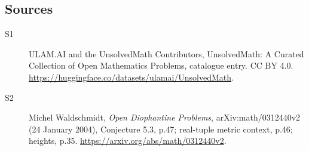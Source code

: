 \documentclass[11pt]{article}
\begin{document}
\subsection{Sources}
\begin{description}
\item[\hypertarget{source:statement:1}{S1}] ULAM.AI and the UnsolvedMath Contributors, UnsolvedMath: A Curated Collection of Open Mathematics Problems, catalogue entry. CC BY 4.0. \url{https://huggingface.co/datasets/ulamai/UnsolvedMath}.
\item[\hypertarget{source:statement:2}{S2}] Michel Waldschmidt, \emph{Open Diophantine Problems}, arXiv:math/0312440v2 (24 January 2004), Conjecture 5.3, p.47; real-tuple metric context, p.46; heights, p.35. \url{https://arxiv.org/abs/math/0312440v2}.
\end{description}
\label{end:statement}
\end{document}
